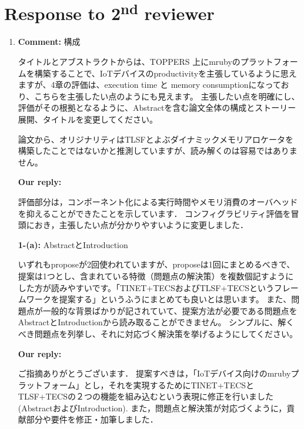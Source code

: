 \documentclass{article}
\newcommand\nd{\textsuperscript{nd}\xspace}
\begin{document}
\section{Response to 2\nd reviewer}

\begin{enumerate}

\item \begin{flushleft}
\textbf{Comment:} 構成

タイトルとアブストラクトからは、TOPPERS 上にmrubyのプラットフォームを構築することで、IoTデバイスのproductivityを主張しているように思えますが、4章の評価は、execution time と memory consumptionになっており、こちらを主張したい点のようにも見えます。
主張したい点を明確にし、評価がその根拠となるように、Abstractを含む論文全体の構成とストーリー展開、タイトルを変更してください。

論文から、オリジナリティはTLSFとよぶダイナミックメモリアロケータを構築したことではないかと推測していますが、読み解くのは容易ではありません。
\end{flushleft}
\begin{flushleft}
\textbf{Our reply:}

評価部分は，コンポーネント化による実行時間やメモリ消費のオーバヘッドを抑えることができたことを示しています．
コンフィグラビリティ評価を冒頭におき，主張したい点が分かりやすいように変更しました．

\end{flushleft}

\begin{flushleft}
\textbf{1-(a):} AbstractとIntroduction

いずれもproposeが2回使われていますが、proposeは1回にまとめるべきで、提案は1つとし、含まれている特徴（問題点の解決策）を複数個記すようにした方が読みやすいです。「TINET+TECSおよびTLSF+TECSというフレームワークを提案する」というふうにまとめても良いとは思います。
また、問題点が一般的な背景ばかりが記されていて、提案方法が必要である問題点をAbstractとIntroductionから読み取ることができません。
シンプルに、解くべき問題点を列挙し、それに対応づく解決策を挙げるようにしてください。
\end{flushleft}
\begin{flushleft}
\textbf{Our reply:}

ご指摘ありがとうございます．
提案すべきは，「IoTデバイス向けのmrubyプラットフォーム」とし，それを実現するためにTINET+TECSとTLSF+TECSの２つの機能を組み込むという表現に修正を行いました(AbstractおよびIntroduction).
また，問題点と解決策が対応づくように，貢献部分や要件を修正・加筆しました．


\end{flushleft}
\end{enumerate}
\end{document}

